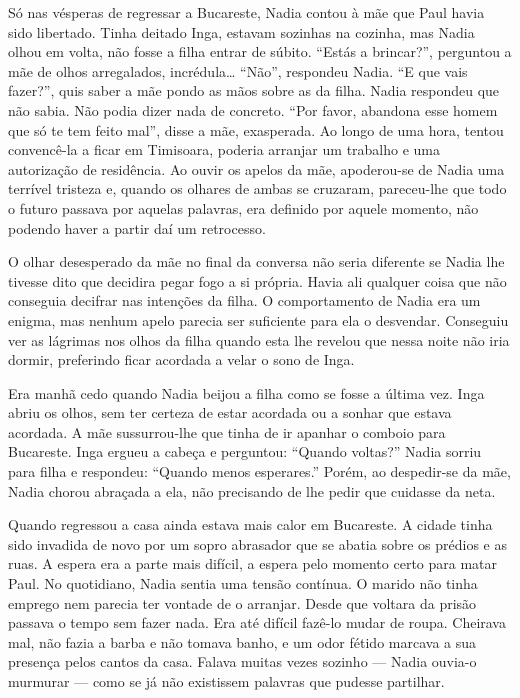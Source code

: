Só nas vésperas de regressar a Bucareste, Nadia contou à mãe que Paul
havia sido libertado. Tinha deitado Inga, estavam sozinhas na cozinha,
mas Nadia olhou em volta, não fosse a filha entrar de súbito. ``Estás a
brincar?'', perguntou a mãe de olhos arregalados, incrédula\ldots{}
``Não'', respondeu Nadia. ``E que vais fazer?'', quis saber a mãe pondo as
mãos sobre as da filha. Nadia respondeu que não sabia. Não podia dizer
nada de concreto. ``Por favor, abandona esse homem que só te tem feito
mal'', disse a mãe, exasperada. Ao longo de uma hora, tentou convencê-la
a ficar em Timisoara, poderia arranjar um trabalho e uma autorização de
residência. Ao ouvir os apelos da mãe, apoderou-se de Nadia uma terrível
tristeza e, quando os olhares de ambas se cruzaram, pareceu-lhe que todo
o futuro passava por aquelas palavras, era definido por aquele momento,
não podendo haver a partir daí um retrocesso.

O olhar desesperado da mãe no final da conversa não
seria diferente se Nadia lhe tivesse dito que decidira pegar
fogo a si própria. Havia ali qualquer coisa que não conseguia decifrar
nas intenções da filha. O comportamento de Nadia era um enigma, mas
nenhum apelo parecia ser suficiente para ela o desvendar. Conseguiu ver
as lágrimas nos olhos da filha quando esta lhe revelou que nessa noite
não iria dormir, preferindo ficar acordada a velar o sono de Inga.

Era manhã cedo quando Nadia beijou a filha como se fosse a última vez.
Inga abriu os olhos, sem ter certeza de estar acordada ou a sonhar que
estava acordada. A mãe sussurrou-lhe que tinha de ir apanhar o comboio
para Bucareste. Inga ergueu a cabeça e perguntou: ``Quando voltas?'' Nadia
sorriu para filha e respondeu: ``Quando menos esperares.'' Porém, ao
despedir-se da mãe, Nadia chorou abraçada a ela, não precisando de lhe
pedir que cuidasse da neta.

Quando regressou a casa ainda estava mais calor em Bucareste. A cidade
tinha sido invadida de novo por um sopro abrasador que se abatia sobre
os prédios e as ruas. A espera era a parte mais difícil, a espera pelo
momento certo para matar Paul. No quotidiano, Nadia sentia uma tensão
contínua. O marido não tinha emprego nem parecia ter vontade de o
arranjar. Desde que voltara da prisão passava o tempo sem fazer nada.
Era até difícil fazê-lo mudar de roupa. Cheirava mal, não fazia a barba
e não tomava banho, e um odor fétido marcava a sua presença pelos cantos
da casa. Falava muitas vezes sozinho --- Nadia ouvia-o murmurar --- como
se já não existissem palavras que pudesse partilhar.


